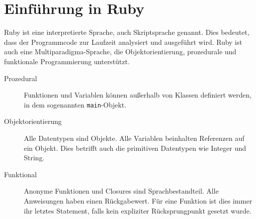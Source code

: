 \section{Einführung in Ruby}
Ruby ist eine interpretierte Sprache, auch Skriptsprache genannt. Dies bedeutet, dass der Programmcode zur Laufzeit analysiert und ausgeführt wird. Ruby ist auch eine Multiparadigma\hyp{}Sprache, die Objektorientierung, prozedurale und funktionale Programmierung unterstützt.
\begin{description}
 \item[Prozedural] Funktionen und Variablen können außerhalb von Klassen definiert werden, in dem sogenannten \texttt{main}-Objekt.
 \item[Objektorientierung] Alle Datentypen sind Objekte. Alle Variablen beinhalten Referenzen auf ein Objekt. Dies betrifft auch die primitiven Datentypen wie Integer und String.
 \item[Funktional] Anonyme Funktionen und Closures sind Sprachbestandteil. Alle Anweisungen haben einen Rückgabewert. Für eine Funktion ist dies immer ihr letztes Statement, falls kein expliziter Rücksprungpunkt gesetzt wurde.
\end{description}


